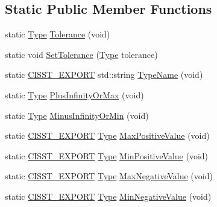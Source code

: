 \subsection*{Static Public Member Functions}
\begin{DoxyCompactItemize}
\item 
static \hyperlink{classcmn_type_traits_aefe66f235207b010b396b5558529a1da}{Type} \hyperlink{classcmn_type_traits_adc129bf9867295b90d300768b780fa99}{Tolerance} (void)
\item 
static void \hyperlink{classcmn_type_traits_a69fc7819cca0dc236e0986a2279752bb}{Set\-Tolerance} (\hyperlink{classcmn_type_traits_aefe66f235207b010b396b5558529a1da}{Type} tolerance)
\item 
static \hyperlink{cmn_export_macros_8h_a99393e0c3ac434b2605235bbe20684f8}{C\-I\-S\-S\-T\-\_\-\-E\-X\-P\-O\-R\-T} std\-::string \hyperlink{classcmn_type_traits_a6c47af27fd91c3b676389447c746c348}{Type\-Name} (void)
\item 
static \hyperlink{classcmn_type_traits_aefe66f235207b010b396b5558529a1da}{Type} \hyperlink{classcmn_type_traits_a0ee3b17c98d4ab75132a59601468c7e8}{Plus\-Infinity\-Or\-Max} (void)
\item 
static \hyperlink{classcmn_type_traits_aefe66f235207b010b396b5558529a1da}{Type} \hyperlink{classcmn_type_traits_afe6bf0685eb634e6982a7ae0c7d3333b}{Minus\-Infinity\-Or\-Min} (void)
\item 
static \hyperlink{cmn_export_macros_8h_a99393e0c3ac434b2605235bbe20684f8}{C\-I\-S\-S\-T\-\_\-\-E\-X\-P\-O\-R\-T} \hyperlink{classcmn_type_traits_aefe66f235207b010b396b5558529a1da}{Type} \hyperlink{classcmn_type_traits_a7722da6e6b3848f513ccd27ba66db533}{Max\-Positive\-Value} (void)
\item 
static \hyperlink{cmn_export_macros_8h_a99393e0c3ac434b2605235bbe20684f8}{C\-I\-S\-S\-T\-\_\-\-E\-X\-P\-O\-R\-T} \hyperlink{classcmn_type_traits_aefe66f235207b010b396b5558529a1da}{Type} \hyperlink{classcmn_type_traits_a77e9c73609fea51d7e1ee282899c9f5c}{Min\-Positive\-Value} (void)
\item 
static \hyperlink{cmn_export_macros_8h_a99393e0c3ac434b2605235bbe20684f8}{C\-I\-S\-S\-T\-\_\-\-E\-X\-P\-O\-R\-T} \hyperlink{classcmn_type_traits_aefe66f235207b010b396b5558529a1da}{Type} \hyperlink{classcmn_type_traits_a06500a4d63c35d03b7f0c1b0dc2aba07}{Max\-Negative\-Value} (void)
\item 
static \hyperlink{cmn_export_macros_8h_a99393e0c3ac434b2605235bbe20684f8}{C\-I\-S\-S\-T\-\_\-\-E\-X\-P\-O\-R\-T} \hyperlink{classcmn_type_traits_aefe66f235207b010b396b5558529a1da}{Type} \hyperlink{classcmn_type_traits_abd691df0cb5ce7278bb33f3184300c29}{Min\-Negative\-Value} (void)

\end{DoxyCompactItemize}
